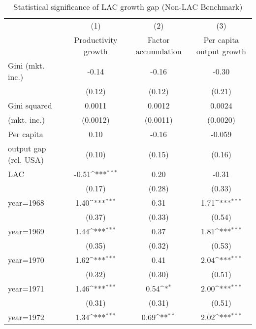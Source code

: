 \begin{sidewaystable}[htbp]\centering
\def\sym#1{\ifmmode^{#1}\else\(^{#1}\)\fi}
\caption{Statistical significance of LAC growth gap (Non-LAC Benchmark)}
\begin{tabular}{l*{3}{c}}
\toprule
                &\multicolumn{1}{c}{(1)}&\multicolumn{1}{c}{(2)}&\multicolumn{1}{c}{(3)}\\
                &\multicolumn{1}{c}{Productivity growth}&\multicolumn{1}{c}{Factor accumulation}&\multicolumn{1}{c}{Per capita output growth}\\
\midrule
Gini (mkt. inc.)&    -0.14         &    -0.16         &    -0.30         \\
                &   (0.12)         &   (0.12)         &   (0.21)         \\
\addlinespace
Gini squared    &   0.0011         &   0.0012         &   0.0024         \\
(mkt. inc.)     & (0.0012)         & (0.0011)         & (0.0020)         \\
\addlinespace
Per capita      &     0.10         &    -0.16         &   -0.059         \\
output gap (rel. USA)&   (0.10)         &   (0.15)         &   (0.16)         \\
\addlinespace
LAC             &    -0.51\sym{***}&     0.20         &    -0.31         \\
                &   (0.17)         &   (0.28)         &   (0.33)         \\
\addlinespace
year=1968       &     1.40\sym{***}&     0.31         &     1.71\sym{***}\\
                &   (0.37)         &   (0.33)         &   (0.54)         \\
\addlinespace
year=1969       &     1.44\sym{***}&     0.37         &     1.81\sym{***}\\
                &   (0.35)         &   (0.32)         &   (0.53)         \\
\addlinespace
year=1970       &     1.62\sym{***}&     0.41         &     2.04\sym{***}\\
                &   (0.32)         &   (0.30)         &   (0.51)         \\
\addlinespace
year=1971       &     1.46\sym{***}&     0.54\sym{*}  &     2.00\sym{***}\\
                &   (0.31)         &   (0.31)         &   (0.51)         \\
\addlinespace
year=1972       &     1.34\sym{***}&     0.69\sym{**} &     2.02\sym{***}\\

\end{tabular}
\end{sidewaystable}

